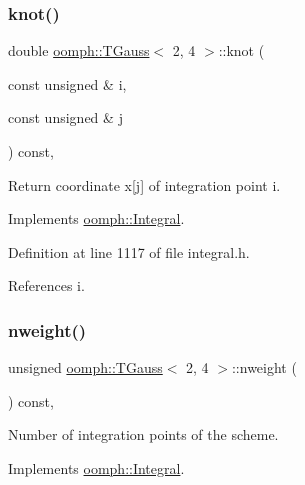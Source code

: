 \subsubsection{\texorpdfstring{knot()}{knot()}}
{\footnotesize\ttfamily double \hyperlink{classoomph_1_1TGauss}{oomph\+::\+T\+Gauss}$<$ 2, 4 $>$\+::knot (\begin{DoxyParamCaption}\item[{const unsigned \&}]{i,  }\item[{const unsigned \&}]{j }\end{DoxyParamCaption}) const\hspace{0.3cm}{\ttfamily [inline]}, {\ttfamily [virtual]}}



Return coordinate x\mbox{[}j\mbox{]} of integration point i. 



Implements \hyperlink{classoomph_1_1Integral_a1a2122f99a87c18649bafdd9ed739758}{oomph\+::\+Integral}.



Definition at line 1117 of file integral.\+h.



References i.

\mbox{\label{classoomph_1_1TGauss_3_012_00_014_01_4_a54f2ee9adb6fef423240b9cd642c55a1}} 
\subsubsection{\texorpdfstring{nweight()}{nweight()}}
{\footnotesize\ttfamily unsigned \hyperlink{classoomph_1_1TGauss}{oomph\+::\+T\+Gauss}$<$ 2, 4 $>$\+::nweight (\begin{DoxyParamCaption}{ }\end{DoxyParamCaption}) const\hspace{0.3cm}{\ttfamily [inline]}, {\ttfamily [virtual]}}



Number of integration points of the scheme. 



Implements \hyperlink{classoomph_1_1Integral_a1a270de9d99a1fcf1d25a6c1017f65fa}{oomph\+::\+Integral}.



